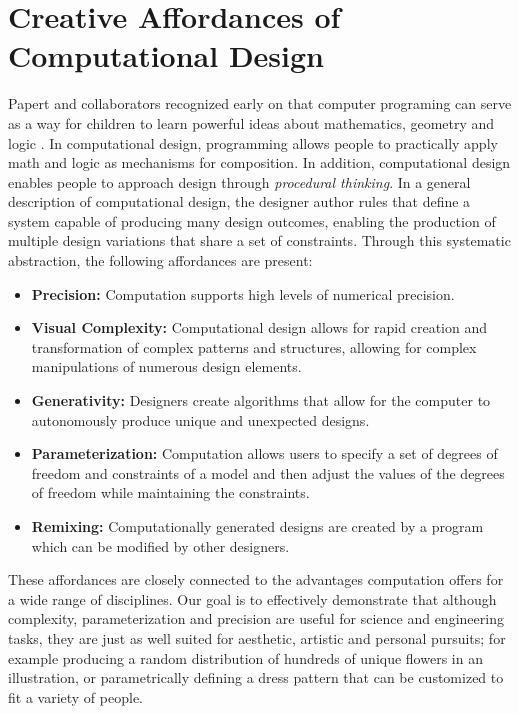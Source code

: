 \documentclass{sigchi}
\begin{document}
\section{Creative Affordances of Computational Design}
Papert and collaborators recognized early on that computer programing can serve as a way for children to learn powerful ideas about mathematics, geometry and logic \cite{papert}. In computational design, programming allows people to practically apply math and logic as mechanisms for composition. In addition, computational design enables people to approach design through \textit{procedural thinking}. In a general description of computational design, the designer author rules that define a system capable of producing many design outcomes, enabling the production of multiple design variations that share a set of constraints. Through this systematic abstraction, the following affordances are present\cite{reas}:
\begin{itemize}
\item \textbf{Precision:} Computation supports high levels of numerical precision.
\vspace{-8pt}
\item \textbf{Visual Complexity:} Computational design allows for rapid creation and transformation of complex patterns and structures, allowing for complex manipulations of numerous design elements.
\vspace{-6pt}
\item \textbf{Generativity:} Designers create algorithms that allow for the computer to autonomously produce unique and unexpected designs.
\vspace{-6pt}
\item \textbf{Parameterization:} Computation allows users to specify a set of degrees of freedom and constraints of a model and then adjust the values of the degrees of freedom while maintaining the constraints.
\vspace{-6pt}
\item \textbf{Remixing:} Computationally generated designs are created by a program which can be modified by other designers. 
\end{itemize} 
These affordances are closely connected to the advantages computation offers for a wide range of disciplines. Our goal is to effectively demonstrate that although complexity, parameterization and precision are useful for science and engineering tasks, they are just as well suited for aesthetic, artistic and personal pursuits; for example producing a random distribution of hundreds of unique flowers in an illustration, or parametrically defining a dress pattern that can be customized to fit a variety of people. 
\end{document}
